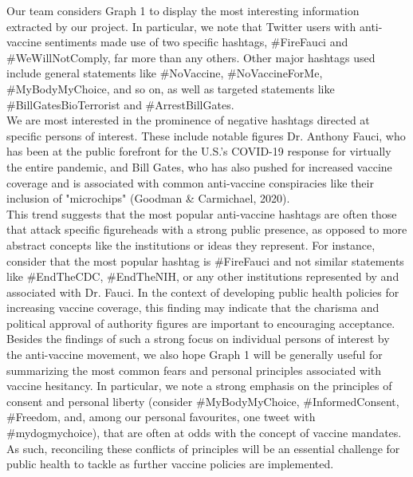 \documentclass[fontsize=11pt]{article}
\begin{document}
Our team considers Graph 1 to display the most interesting information extracted by our project. In particular, we note that Twitter users with anti-vaccine sentiments made use of two specific hashtags, \#FireFauci and \#WeWillNotComply, far more than any others. Other major hashtags used include general statements like \#NoVaccine, \#NoVaccineForMe, \#MyBodyMyChoice, and so on, as well as targeted statements like \#BillGatesBioTerrorist and \#ArrestBillGates. \\

We are most interested in the prominence of negative hashtags directed at specific persons of interest. These include notable figures Dr. Anthony Fauci, who has been at the public forefront for the U.S.'s COVID-19 response for virtually the entire pandemic, and Bill Gates, who has also pushed for increased vaccine coverage and is associated with common anti-vaccine conspiracies like their inclusion of "microchips" (Goodman \& Carmichael, 2020). \\

This trend suggests that the most popular anti-vaccine hashtags are often those that attack specific figureheads with a strong public presence, as opposed to more abstract concepts like the institutions or ideas they represent. For instance, consider that the most popular hashtag is \#FireFauci and not similar statements like \#EndTheCDC, \#EndTheNIH, or any other institutions represented by and associated with Dr. Fauci. In the context of developing public health policies for increasing vaccine coverage, this finding may indicate that the charisma and political approval of authority figures are important to encouraging acceptance. \\

Besides the findings of such a strong focus on individual persons of interest by the anti-vaccine movement, we also hope Graph 1 will be generally useful for summarizing the most common fears and personal principles associated with vaccine hesitancy. In particular, we note a strong emphasis on the principles of consent and personal liberty (consider \#MyBodyMyChoice, \#InformedConsent, \#Freedom, and, among our personal favourites, one tweet with \#mydogmychoice), that are often at odds with the concept of vaccine mandates. As such, reconciling these conflicts of principles will be an essential challenge for public health to tackle as further vaccine policies are implemented. \\
\end{document}
